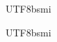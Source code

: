\documentclass[12pt,a4paper]{article}
\title{}
\author{莊典融(Tien-Jung Chuang)}%
\date{\today} %
\theoremstyle{remark}
\begin{document}
\begin{CJK}{UTF8}{bsmi}
\maketitle
\end{CJK} %
\begin{CJK}{UTF8}{bsmi}
\end{CJK}
\end{document}
